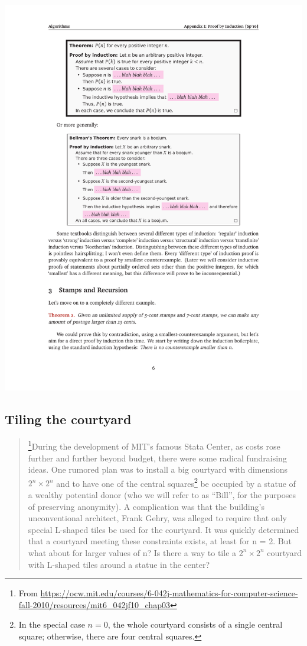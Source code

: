 \documentclass[12pt]{article}
\begin{document}
\includegraphics{w01-inductionB.pdf}

\clearpage
\subsection{Tiling the courtyard}

\begin{quote}
    \footnote{From \url{https://ocw.mit.edu/courses/6-042j-mathematics-for-computer-science-fall-2010/resources/mit6_042jf10_chap03}}During the development of MIT's famous Stata Center, as costs rose further and further beyond budget, there were some radical fundraising ideas. One rumored plan was to install a big courtyard with dimensions $2^n \times 2^n$ and to have one of the central squares\footnote{In the special case $n = 0$, the whole courtyard consists of a single central square; otherwise, there are four central squares.} be occupied by a
statue of a wealthy potential donor (who we will refer to as “Bill”, for the purposes of preserving anonymity). A complication was that the building's unconventional
architect, Frank Gehry, was alleged to require that only special L-shaped tiles be used for the courtyard. It was quickly determined that a courtyard meeting these constraints exists, at least for n = 2. But what about for larger values of n? Is there a way to tile a $2^n \times 2^n$ courtyard with L-shaped tiles around a statue in the center?
\end{quote}
\end{document}
